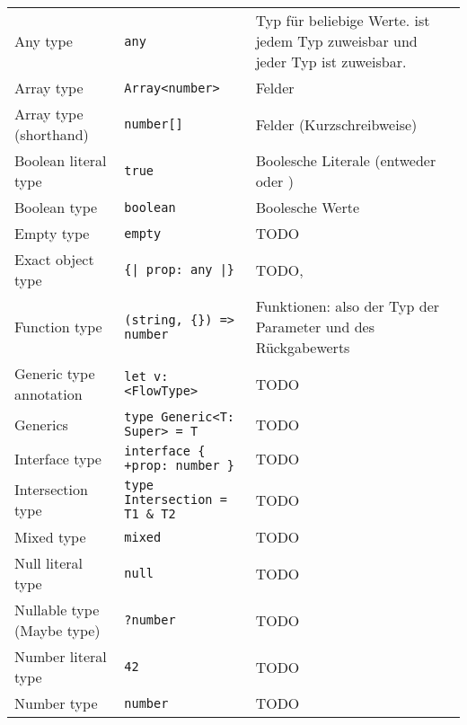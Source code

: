\bigbreak
\begin{footnotesize}
\begin{longtabu} to 
  \midrule
   &  &  \\
  \midrule
  \endhead
  Any type                   & \texttt{any}                             & Typ für beliebige Werte.  ist jedem Typ zuweisbar und jeder Typ ist  zuweisbar. \\
  Array type                 & \texttt{Array<{}number>{}}               & Felder \\
  Array type (shorthand)     & \texttt{number[]}                        & Felder (Kurzschreibweise) \\
  Boolean literal type       & \texttt{true}                            & Boolesche Literale (entweder  oder ) \\
  Boolean type               & \texttt{boolean}                         & Boolesche Werte \\
  Empty type                 & \texttt{empty}                           & TODO \\
  Exact object type          & \texttt{\{| prop: any |\}}               & TODO, \\
  Function type              & \texttt{(string, \{\}) => number}        & Funktionen: also der Typ der Parameter und des Rückgabewerts \\
  Generic type annotation    & \texttt{let v: <{}FlowType>{}}           & TODO \\
  Generics                   & \texttt{type Generic<{}T: Super> = T}    & TODO \\
  Interface type             & \texttt{interface \{ +prop: number \}}   & TODO \\
  Intersection type          & \texttt{type Intersection = T1 \& T2}    & TODO \\
  Mixed type                 & \texttt{mixed}                           & TODO \\
  Null literal type          & \texttt{null}                            & TODO \\
  Nullable type (Maybe type) & \texttt{?number}                         & TODO \\
  Number literal type        & \texttt{42}                              & TODO \\
  Number type                & \texttt{number}                          & TODO \\

\end{longtabu}
\end{footnotesize}
